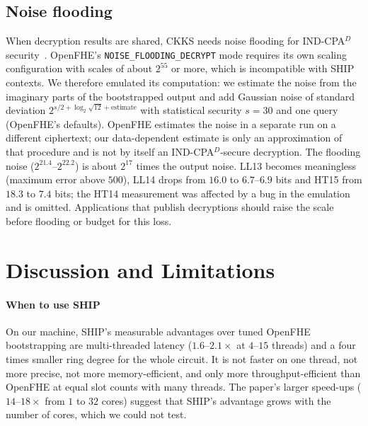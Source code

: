 \documentclass[sigconf,nonacm]{acmart}
\begin{document}
\subsection{Noise flooding}
When decryption results are shared, CKKS needs noise flooding for IND-CPA$^D$ security~\cite{LM21}.
OpenFHE's \texttt{NOISE\_FLOODING\_DECRYPT} mode requires its own scaling configuration with scales of about $2^{55}$ or more, which is incompatible with SHIP contexts.
We therefore emulated its computation: we estimate the noise from the imaginary parts of the bootstrapped output and add Gaussian noise of standard deviation $2^{s/2+\log_2\sqrt{12}+\text{estimate}}$ with statistical security $s=30$ and one query (OpenFHE's defaults).
OpenFHE estimates the noise in a separate run on a different ciphertext; our data-dependent estimate is only an approximation of that procedure and is not by itself an IND-CPA$^D$-secure decryption.
The flooding noise ($2^{21.4}$--$2^{22.2}$) is about $2^{17}$ times the output noise.
LL13 becomes meaningless (maximum error above $500$), LL14 drops from $16.0$ to $6.7$--$6.9$ bits and HT15 from $18.3$ to $7.4$ bits; the HT14 measurement was affected by a bug in the emulation and is omitted.
Applications that publish decryptions should raise the scale before flooding or budget for this loss.

\section{Discussion and Limitations}
\label{sec:discussion}

\paragraph{When to use SHIP}
On our machine, SHIP's measurable advantages over tuned OpenFHE bootstrapping are multi-threaded latency ($1.6$--$2.1\times$ at $4$--$15$ threads) and a four times smaller ring degree for the whole circuit.
It is not faster on one thread, not more precise, not more memory-efficient, and only more throughput-efficient than OpenFHE at equal slot counts with many threads.
The paper's larger speed-ups ($14$--$18\times$ from $1$ to $32$ cores) suggest that SHIP's advantage grows with the number of cores, which we could not test.
\end{document}
